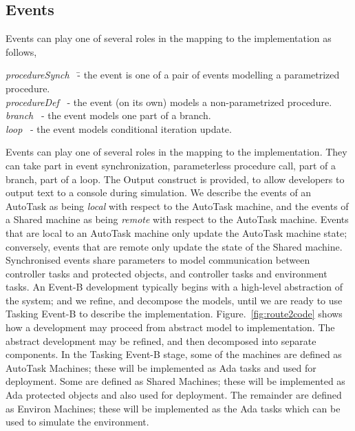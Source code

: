 \subsection{Events}
Events can play one of several roles in the mapping to the implementation as follows,
%
\begin{center}
\begin{minipage}{0.9\textwidth}
\begin{tabbing}
\emph{procedureSynch}~  \=- the event is one of a pair of events modelling a parametrized procedure.
\\
\emph{procedureDef}~ \>- the event (on its own) models a non-parametrized procedure.
\\
\emph{branch}~  \>- the event models one part of a branch.
\\
\emph{loop}~  \>- the event models conditional iteration update.
\end{tabbing}
\end{minipage}
\end{center}
%
Events can play one of several roles in the mapping to the implementation. They can take part in event synchronization, parameterless procedure call, part of a branch, part of a loop. The Output construct is provided, to allow developers to output text to a console during simulation. We describe the events of an AutoTask as being \emph{local} with respect to the AutoTask machine, and the events of a Shared machine as being \emph{remote} with respect to the AutoTask machine. Events that are local to an AutoTask machine only update the AutoTask machine state; conversely, events that are remote only update the state of the Shared machine. Synchronised events share parameters to model communication between controller tasks and protected objects, and controller tasks and environment tasks. 
%
An Event-B development typically begins with a high-level abstraction of the system; and we refine, and decompose the models, until we are ready to use Tasking Event-B to describe the implementation. Figure.~\ref{fig:route2code} shows how a development may proceed from abstract model to implementation. The abstract development may be refined, and then decomposed into separate components. In the Tasking Event-B stage, some of the machines are defined as AutoTask Machines; these will be implemented as Ada tasks and used for deployment. Some are defined as Shared Machines; these will be implemented as Ada protected objects and also used for deployment. The remainder are defined as Environ Machines; these will be implemented as the Ada tasks which can be used to simulate the environment. 
%
